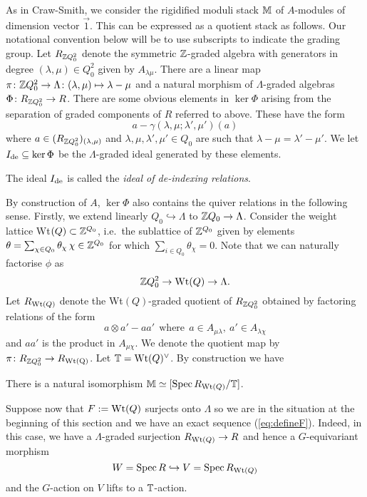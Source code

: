 \documentclass[12pt]{amsart}
\begin{document}
As in Craw-Smith, we consider the rigidified moduli stack $\mathbb{M}$ of $A$-modules of dimension vector $\vec{1}$. This can be expressed as a quotient stack as follows. Our notational convention below will be to use subscripts to indicate the grading group. Let $R_{\mathbb{Z} Q_0^2}$ denote the symmetric $\mathbb{Z}$-graded algebra with generators in degree $(\lambda,\mu) \in Q_0^2$ given by $A_{\lambda\mu}$. There are a linear map $\pi \colon \mathbb{Z} Q_0^2 \to \Lambda \colon (\lambda,\mu) \mapsto \lambda - \mu$ and a natural morphism of $\Lambda$-graded algebras $\Phi \colon R_{\mathbb{Z} Q_0^2} \to R$. There are some obvious elements in $\ker \Phi$ arising from the separation of graded components of $R$ referred to above. These have the form 
\begin{equation}  \label{eq:deindex}
    a - \gamma(\lambda,\mu;\lambda',\mu') (a)
\end{equation}
where $a \in (R_{\mathbb{Z} Q_0^2})_{(\lambda,\mu)}$ and $\lambda,\mu,\lambda',\mu' \in Q_0$ are such that $\lambda - \mu = \lambda' - \mu'$. We let $I_{\textup{de}}\subseteq \ker \Phi$ be the $\Lambda$-graded ideal generated by these elements.
\begin{definition}  \label{def:deindex}
The ideal $I_{\textup{de}}$ is called the {\em ideal of de-indexing relations}.
\end{definition}
By construction of $A$, $\ker \Phi$ also contains the quiver relations in the following sense. Firstly, we extend linearly $Q_0 \hookrightarrow \Lambda$ to $\mathbb{Z} Q_0 \to \Lambda$. Consider the weight lattice Wt$(Q) \subset \mathbb{Z}^{Q_0}$, i.e.\ the sublattice of $\mathbb{Z}^{Q_0}$ given by elements $\theta = \sum_{\chi\in Q_0} \theta_\chi \,\chi \in \mathbb{Z}^{Q_0}$ for which $\sum_{i \in Q_0} \theta_\chi = 0$. Note that we can naturally factorise $\phi$ as 
$$ \mathbb{Z} Q_0^2 \to \textup{Wt}(Q) \to \Lambda.$$
Let $R_{\textup{Wt}(Q)}$ denote the Wt$(Q)$-graded quotient of $R_{\mathbb{Z} Q_0^2}$ obtained by factoring relations of the form
$$ a \otimes a' - aa' \ \ \text{where} \ \ a \in A_{\mu\lambda},\ a' \in A_{\lambda\chi}$$
and $aa'$ is the product in $A_{\mu\chi}$. We denote the quotient map by $\pi \colon R_{\mathbb{Z} Q_0^2} \to R_{\textup{Wt(Q)}}$. Let $\mathbb{T} = \textup{Wt}(Q)^{\vee}$. By construction we have
\begin{proposition}  \label{prop:modulireps}
There is a natural isomorphism $\mathbb{M} \simeq [\operatorname{Spec} R_{\textup{Wt}(Q)} / \mathbb{T}]$. 
\end{proposition}
Suppose now that $F:=\textup{Wt}(Q)$ surjects onto $\Lambda$ so we are in the situation at the beginning of this section and we have an exact sequence (\ref{eq:defineF}). Indeed, in this case, we have a $\Lambda$-graded surjection $R_{\textup{Wt}(Q)} \to R$ and hence a $G$-equivariant morphism 
$$ W = \operatorname{Spec} R \hookrightarrow V = \operatorname{Spec} R_{\textup{Wt}(Q)}$$
and the $G$-action on $V$ lifts to a $\mathbb{T}$-action. 
\end{document}
